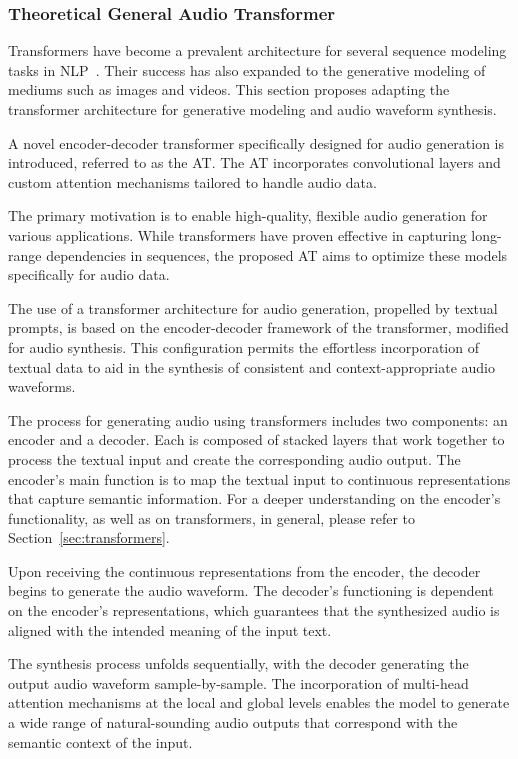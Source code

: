 \subsubsection{Theoretical General Audio Transformer}

Transformers have become a prevalent architecture for several sequence modeling tasks in \ac{NLP}~\cite{gruetzemacher_deep_2022}. Their success has also expanded to the generative modeling of mediums such as images and videos. This section proposes adapting the transformer architecture for generative modeling and audio waveform synthesis.

A novel encoder-decoder transformer specifically designed for audio generation is introduced, referred to as the \acf{AT}. The \ac{AT} incorporates convolutional layers and custom attention mechanisms tailored to handle audio data.

The primary motivation is to enable high-quality, flexible audio generation for various applications. While transformers have proven effective in capturing long-range dependencies in sequences, the proposed \ac{AT} aims to optimize these models specifically for audio data.

The use of a transformer architecture for audio generation, propelled by textual prompts, is based on the encoder-decoder framework of the transformer, modified for audio synthesis. This configuration permits the effortless incorporation of textual data to aid in the synthesis of consistent and context-appropriate audio waveforms.

The process for generating audio using transformers includes two components: an encoder and a decoder. Each is composed of stacked layers that work together to process the textual input and create the corresponding audio output. The encoder's main function is to map the textual input to continuous representations that capture semantic information. For a deeper understanding on the encoder's functionality, as well as on transformers, in general, please refer to Section~\ref{sec:transformers}.

Upon receiving the continuous representations from the encoder, the decoder begins to generate the audio waveform. The decoder's functioning is dependent on the encoder's representations, which guarantees that the synthesized audio is aligned with the intended meaning of the input text. 

The synthesis process unfolds sequentially, with the decoder generating the output audio waveform sample-by-sample. The incorporation of multi-head attention mechanisms at the local and global levels enables the model to generate a wide range of natural-sounding audio outputs that correspond with the semantic context of the input.


